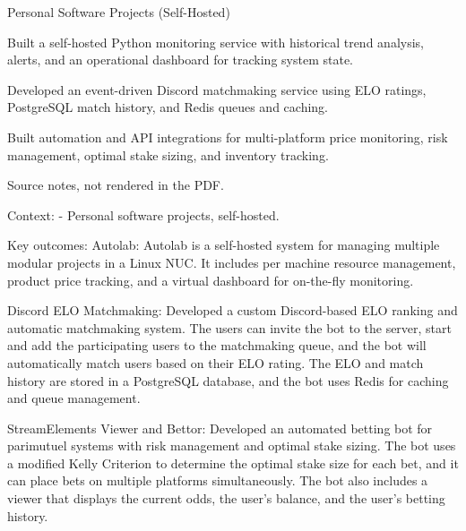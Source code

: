 \begin{cventries}

  \cventry
    {} %
    {Personal Software Projects (Self-Hosted)} %
    {} %
    {} %
    {
      \begin{cvitems} %
        \item {Built a self-hosted Python monitoring service with historical trend analysis, alerts, and an operational dashboard for tracking system state.}
        \item {Developed an event-driven Discord matchmaking service using ELO ratings, PostgreSQL match history, and Redis queues and caching.}
        \item {Built automation and API integrations for multi-platform price monitoring, risk management, optimal stake sizing, and inventory tracking.}
      \end{cvitems}
    } %
    {
    Source notes, not rendered in the PDF.

    Context:
    - Personal software projects, self-hosted.

    Key outcomes:
      Autolab:
        Autolab is a self-hosted system for managing multiple modular projects in a Linux NUC.
        It includes per machine resource management, product price tracking, and a virtual dashboard for on-the-fly monitoring.

        Discord ELO Matchmaking:
          Developed a custom Discord-based ELO ranking and automatic matchmaking system.
          The users can invite the bot to the server, start and add the participating users to the matchmaking queue, and the bot will automatically match users based on their ELO rating.
          The ELO and match history are stored in a PostgreSQL database, and the bot uses Redis for caching and queue management.

        StreamElements Viewer and Bettor:
          Developed an automated betting bot for parimutuel systems with risk management and optimal stake sizing.
          The bot uses a modified Kelly Criterion to determine the optimal stake size for each bet, and it can place bets on multiple platforms simultaneously.
          The bot also includes a viewer that displays the current odds, the user's balance, and the user's betting history.

}
\end{cventries}
